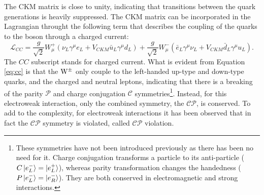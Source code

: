 The CKM matrix is close to unity, indicating that transitions between the quark generations is heavily suppressed.  
The CKM matrix can be incorporated in the Lagrangian throught the following term that describes the coupling of the quarks to the \PW boson through a charged current:
\begin{equation}
\mathcal{L}_{CC}=\frac{g}{\sqrt{2}}W^{+}_{\mu}(\nu_{L}\gamma^{\mu}e_{L} +V_{CKM}\bar{u}_{L}\gamma^{\mu}d_{L})+\frac{g}{\sqrt{2}}W^{-}_{\mu}(\bar{e}_{L}\gamma^{\mu}\nu_{L} +V_{CKM}\bar{d}_{L}\gamma^{\mu}u_{L}).
\label{eq:cc}
\end{equation}
The $CC$ subscript stands for charged current.
What is evident from Equation \ref{eq:cc} is that the $\mathrm{W}^{\pm}$ only couple to the left-handed up-type and down-type quarks, and the charged and neutral leptons, indicating that there is a breaking of the parity $\mathcal{P}$ and charge conjugation $\mathcal{C}$ symmetries\footnote{These symmetries have not been introduced previously as there has been no need for it. Charge conjugation transforms a particle to its anti-particle ($C\ket{e^{-}_{L}}=\ket{e^{+}_{L}}$), whereas parity transformation changes the handedness ($P\ket{e^{-}_{L}}=\ket{e^{-}_{R}}$). They are both conserved in electromagnetic and strong interactions.}. 
Instead, for this electroweak interaction, only the combined symmetry, the $\mathcal{CP}$, is conserved.
To add to the complexity, for electroweak interactions it has been observed that in fact the $\mathcal{CP}$ symmetry is violated, called $\mathcal{CP}$ violation.  
 
